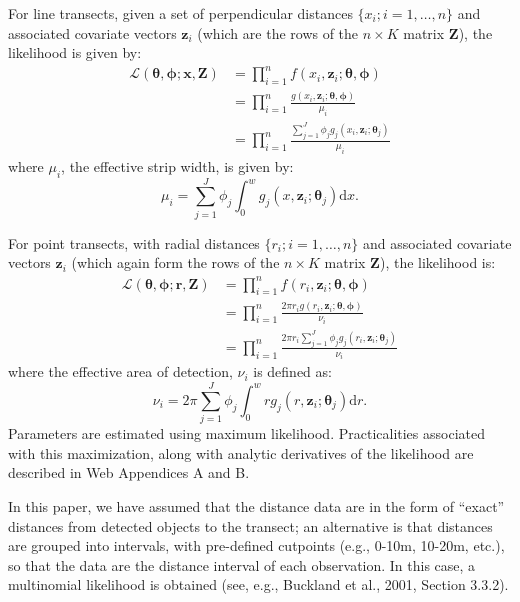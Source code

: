 \documentclass[useAMS,referee]{biom}
\begin{document}
For line transects, given a set of perpendicular distances $\{x_i; i=1,\ldots,n\}$ and associated covariate vectors $\bm{z}_i$ (which are the rows of the $n \times K$ matrix $\mathbf{Z}$), the likelihood is given by:
\begin{align*}
\mathcal{L}(\bm{\theta},\bm{\phi}; \mathbf{x},\mathbf{Z}) &= \prod_{i=1}^n f(x_i,\bm{z}_i; \bm{\theta},\bm{\phi})\\
&= \prod_{i=1}^n \frac{g(x_i,\bm{z}_i; \bm{\theta},\bm{\phi})}{\mu_i}\\
&= \prod_{i=1}^n \frac{\sum_{j=1}^J \phi_j g_j(x_i,\bm{z}_i; \bm{\theta}_j)}{\mu_i}
\end{align*}
where $\mu_i$, the effective strip width, is given by:
\begin{equation*}
\mu_{i} = \sum_{j=1}^J \phi_j \int_0^w  g_j(x,\bm{z}_i; \bm{\theta}_j) \text{d}x.
\end{equation*}

For point transects, with radial distances $\{r_i; i=1,\ldots,n\}$ and associated covariate vectors $\bm{z}_i$ (which again form the rows of the $n\times K$ matrix $\mathbf{Z}$), the likelihood is:
\begin{align*}
\mathcal{L}(\bm{\theta},\bm{\phi}; \mathbf{r},\mathbf{Z}) &= \prod_{i=1}^n f(r_i,\bm{z}_i; \bm{\theta},\bm{\phi})\\
&= \prod_{i=1}^n \frac{2 \pi r_i g(r_i,\bm{z}_i; \bm{\theta},\bm{\phi})}{\nu_i}\\
&= \prod_{i=1}^n \frac{2 \pi r_i \sum_{j=1}^J \phi_j g_j(r_i,\bm{z}_i; \bm{\theta}_j)}{\nu_i}
\end{align*}
where the effective area of detection, $\nu_i$ is defined as:
\begin{equation*}
\nu_i = 2\pi \sum_{j=1}^J \phi_j \int_0^w  r g_j(r,\bm{z}_i; \bm{\theta}_j) \text{d}r.
\end{equation*}
Parameters are estimated using maximum likelihood. Practicalities associated with this maximization, along with analytic derivatives of the likelihood are described in Web Appendices A and B.

In this paper, we have assumed that the distance data are in the form of ``exact'' distances from detected objects to the transect; an alternative is that distances are grouped into intervals, with pre-defined cutpoints (e.g., 0-10m, 10-20m, etc.), so that the data are the distance interval of each observation.  In this case, a multinomial likelihood is obtained (see, e.g., Buckland et al., 2001, Section 3.3.2).
\end{document}
